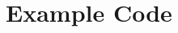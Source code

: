 \documentclass[
minp=25,
maxp=30,
literate,
todo=marginpar,
]{smcm-cosc-smp}[2013/12/23]
\begin{document}






\appendix

\section*{Example Code}


\newpage
\printbibliography

\todos
\end{document}

